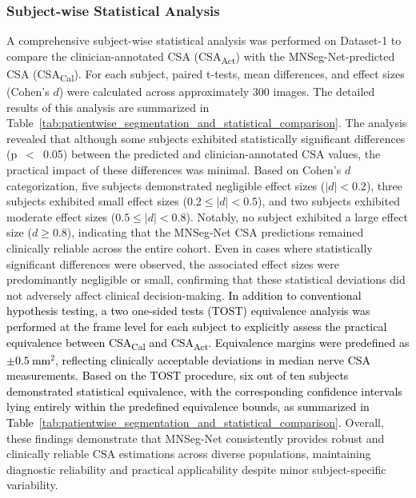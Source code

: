  



\subsubsection{Subject-wise Statistical Analysis} 
\label{sec:Patient_wise_Statistical_Analysis}

A comprehensive subject-wise statistical analysis was performed on Dataset-1 to compare the clinician-annotated CSA (CSA\textsubscript{Act}) with the MNSeg-Net-predicted CSA (CSA\textsubscript{Cal}). For each subject, paired t-tests, mean differences, and effect sizes (Cohen’s \(d\)) were calculated across approximately 300 images. The detailed results of this analysis are summarized in Table~\ref{tab:patientwise_segmentation_and_statistical_comparison}. The analysis revealed that although some subjects exhibited statistically significant differences (p~$<$~0.05) between the predicted and clinician-annotated CSA values, the practical impact of these differences was minimal. Based on Cohen’s \(d\) categorization, five subjects demonstrated negligible effect sizes (\(|d| < 0.2\)), three subjects exhibited small effect sizes (\(0.2 \leq |d| < 0.5\)), and two subjects exhibited moderate effect sizes (\(0.5 \leq |d| < 0.8\)). Notably, no subject exhibited a large effect size (\(d \geq 0.8\)), indicating that the MNSeg-Net CSA predictions remained clinically reliable across the entire cohort. Even in cases where statistically significant differences were observed, the associated effect sizes were predominantly negligible or small, confirming that these statistical deviations did not adversely affect clinical decision-making. \textcolor{black}{In addition to conventional hypothesis testing, a two one-sided tests (TOST) equivalence analysis was performed at the frame level for each subject to explicitly assess the practical equivalence between CSA\textsubscript{Cal} and CSA\textsubscript{Act}. Equivalence margins were predefined as \(\pm 0.5~\mathrm{mm}^2\), reflecting clinically acceptable deviations in median nerve CSA measurements. Based on the TOST procedure, six out of ten subjects demonstrated statistical equivalence, with the corresponding confidence intervals lying entirely within the predefined equivalence bounds, as summarized in Table~\ref{tab:patientwise_segmentation_and_statistical_comparison}.} Overall, these findings demonstrate that MNSeg-Net consistently provides robust and clinically reliable CSA estimations across diverse populations, maintaining diagnostic reliability and practical applicability despite minor subject-specific variability. 




